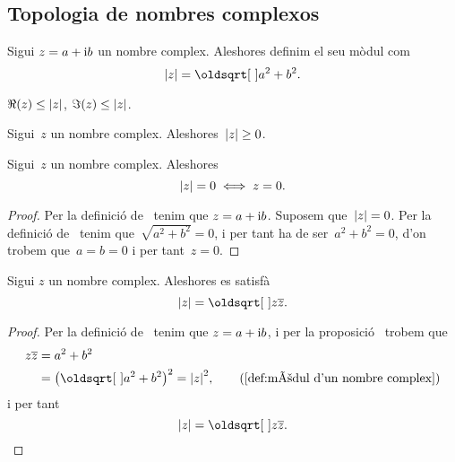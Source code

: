 \documentclass[../Apunts.tex]{subfiles}
\begin{document}
	\subsection{Topologia de nombres complexos}
	\begin{definition}
		\label{def:mòdul d'un nombre complex}
		Sigui \(z=a+\mathrm{i} b\) un nombre complex. Aleshores definim el seu mòdul com
		\[\modul{z}=\sqrt{a^{2}+b^{2}}.\]
	\end{definition}
	\begin{observation}
		\label{obs:les parts real i imaginàries d'un complex són menors que el seu mòdul}
		\label{obs:la part real d'un complex és menor que el seu mòdul}
		\label{obs:la part imaginària d'un complex és menor que el seu mòdul}
		\(\Re(z)\leq\modul{z}\), \(\Im(z)\leq\modul{z}\).
	\end{observation}
	\begin{observation}
		\label{prop:el mòdul d'un nombre complex és no negatiu}
		Sigui~\(z\) un nombre complex. Aleshores~\(\modul{z}\geq0\).
	\end{observation}
	\begin{proposition}
		\label{prop:el mòdul d'un nombre complex és zero si i només si aquest és zero}
		Sigui~\(z\) un nombre complex. Aleshores
		\[\modul{z}=0\sii z=0.\]
	\end{proposition}
	\begin{proof}
		Per la definició de~ tenim que \(z=a+\mathrm{i} b\). Suposem que~\(\modul{z}=0\). Per la definició de~ tenim que~\(\sqrt{a^{2}+b^{2}}=0\), i per tant ha de ser~\(a^{2}+b^{2}=0\), d'on trobem que~\(a=b=0\) i per tant~\(z=0\).
	\end{proof}
	\begin{proposition}
		\label{prop:el mòdul d'un nombre complex és l'arrel del nombre pel seu conjugat}
		Sigui \(z\) un nombre complex. Aleshores es satisfà
		\[\modul{z}=\sqrt{z\conjugat{z}}.\]
	\end{proposition}
	\begin{proof}
		Per la definició de~ tenim que \(z=a+\mathrm{i} b\), i per la proposició~ trobem que
		\begin{align*}
			z\conjugat{z}&=a^{2}+b^{2} \\
			&=\big(\sqrt{a^{2}+b^{2}}\big)^{2}=\modul{z}^{2}, \tag{\ref{def:mòdul d'un nombre complex}}
		\end{align*}
		i per tant 
		\[\modul{z}=\sqrt{z\conjugat{z}}.\qedhere\]
	\end{proof}
\end{document}

